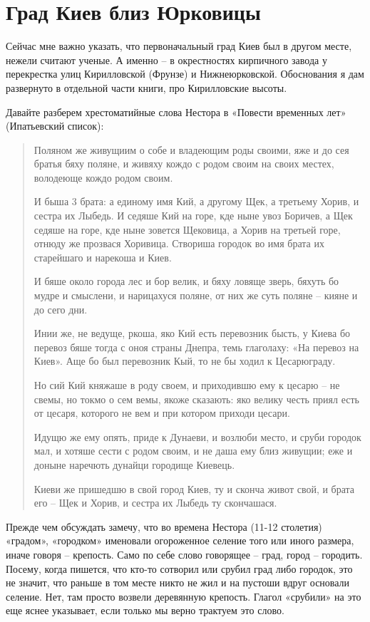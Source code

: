 \chapter{Град Киев близ Юрковицы}

Сейчас мне важно указать, что первоначальный град Киев был в другом месте, нежели считают ученые. А именно – в окрестностях кирпичного завода у перекрестка улиц Кирилловской (Фрунзе) и Нижнеюрковской. Обоснования я дам развернуто в отдельной части книги, про Кирилловские высоты.

Давайте разберем хрестоматийные слова Нестора в «Повести временных лет» (Ипатьевский список):

\begin{quotation}  
Поляном же живущиим о собе и владеющим роды своими, яже и до сея братья бяху поляне, и живяху кождо с родом своим на своих местех, володеюще кождо родом своим. 

И быша 3 брата: а единому имя Кий, а другому Щек, а третьему Хорив, и сестра их Лыбедь. И седяше Кий на горе, кде ныне увоз Боричев, а Щек седяше на горе, кде ныне зовется Щековица, а Хорив на третьей горе, отнюду же прозвася Хоривица. Створиша городок во имя брата их старейшаго и нарекоша и Киев. 

И бяше около города лес и бор велик, и бяху ловяще зверь, бяхуть бо мудре и смыслени, и нарицахуся поляне, от них же суть поляне – кияне и до сего дни.

Инии же, не ведуще, ркоша, яко Кий есть перевозник бысть, у Киева бо перевоз бяше тогда с оноя страны Днепра, темь глаголаху: «На перевоз на Киев». Аще бо был перевозник Кый, то не бы ходил к Цесарюграду. 

Но сий Кий княжаше в роду своем, и приходившю ему к цесарю – не свемы, но токмо о сем вемы, якоже сказають: яко велику честь приял есть от цесаря, которого не вем и при котором приходи цесари. 

Идущю же ему опять, приде к Дунаеви, и возлюби место, и сруби городок мал, и хотяше сести с родом своим, и не даша ему близ живущии; еже и доныне наречють дунайци городище Киевець. 

Киеви же пришедшю в свой город Киев, ту и сконча живот свой, и брата его – Щек и Хорив, и сестра их Лыбедь ту скончашася.
\end{quotation}  

Прежде чем обсуждать замечу, что во времена Нестора (11-12 столетия) «градом», «городком» именовали огороженное селение того или иного размера, иначе говоря – крепость. Само по себе слово говорящее – град, город – городить. Посему, когда пишется, что кто-то сотворил или срубил град либо городок, это не значит, что раньше в том месте никто не жил и на пустоши вдруг основали селение. Нет, там просто возвели деревянную крепость. Глагол «срубили» на это еще яснее указывает, если только мы верно трактуем это слово. 

